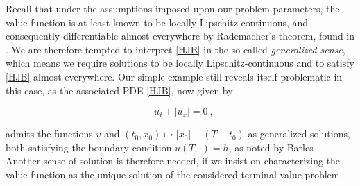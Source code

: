 	Recall that under the assumptions imposed upon our problem parameters, the value function is at least known to be locally Lipschitz-continuous, and consequently differentiable almost everywhere by Rademacher's theorem, found in \cite{evans}. We are therefore tempted to interpret \ref{HJB} in the so-called \emph{generalized sense}, which means we require solutions to be locally Lipschitz-continuous and to satisfy \ref{HJB} almost everywhere. Our simple example still reveals itself problematic in this case, as the associated PDE \ref{HJB}, now given by
	
	\begin{equation*}
		-u_t + \lvert u_x \rvert = 0 \ ,
	\end{equation*}
	
	admits the functions $ v $ and $ (t_0, x_0) \mapsto \lvert x_0 \rvert - (T - t_0) $ as generalized solutions, both satisfying the boundary condition $ u(T, \cdot) = h $, as noted by Barles \cite{barles}. Another sense of solution is therefore needed, if we insist on characterizing the value function as the unique solution of the considered terminal value problem.